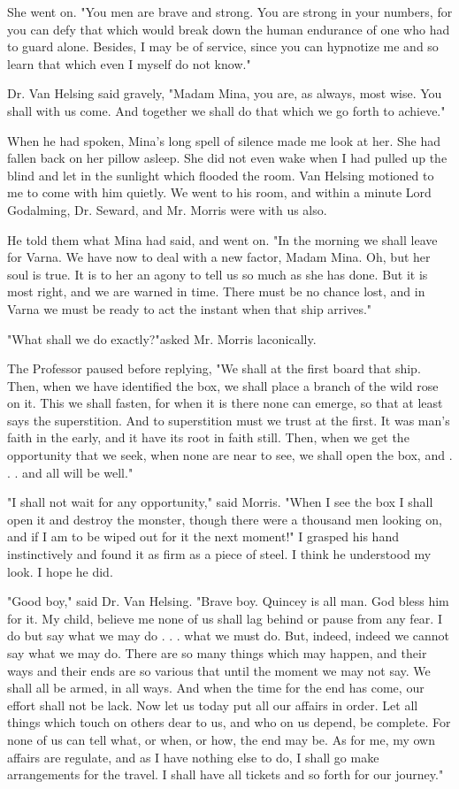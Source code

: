 She went on. "You men are brave and strong. You are strong in your numbers, for you can defy that which would break down the human endurance of one who had to guard alone. Besides, I may be of service, since you can hypnotize me and so learn that which even I myself do not know." 

Dr. Van Helsing said gravely, "Madam Mina, you are, as always, most wise. You shall with us come. And together we shall do that which we go forth to achieve." 

When he had spoken, Mina's long spell of silence made me look at her. She had fallen back on her pillow asleep. She did not even wake when I had pulled up the blind and let in the sunlight which flooded the room. Van Helsing motioned to me to come with him quietly. We went to his room, and within a minute Lord Godalming, Dr. Seward, and Mr. Morris were with us also. 

He told them what Mina had said, and went on. "In the morning we shall leave for Varna. We have now to deal with a new factor, Madam Mina. Oh, but her soul is true. It is to her an agony to tell us so much as she has done. But it is most right, and we are warned in time. There must be no chance lost, and in Varna we must be ready to act the instant when that ship arrives." 

"What shall we do exactly?"asked Mr. Morris laconically. 

The Professor paused before replying, "We shall at the first board that ship. Then, when we have identified the box, we shall place a branch of the wild rose on it. This we shall fasten, for when it is there none can emerge, so that at least says the superstition. And to superstition must we trust at the first. It was man's faith in the early, and it have its root in faith still. Then, when we get the opportunity that we seek, when none are near to see, we shall open the box, and . . . and all will be well." 

"I shall not wait for any opportunity," said Morris. "When I see the box I shall open it and destroy the monster, though there were a thousand men looking on, and if I am to be wiped out for it the next moment!" I grasped his hand instinctively and found it as firm as a piece of steel. I think he understood my look. I hope he did. 

"Good boy," said Dr. Van Helsing. "Brave boy. Quincey is all man. God bless him for it. My child, believe me none of us shall lag behind or pause from any fear. I do but say what we may do . . . what we must do. But, indeed, indeed we cannot say what we may do. There are so many things which may happen, and their ways and their ends are so various that until the moment we may not say. We shall all be armed, in all ways. And when the time for the end has come, our effort shall not be lack. Now let us today put all our affairs in order. Let all things which touch on others dear to us, and who on us depend, be complete. For none of us can tell what, or when, or how, the end may be. As for me, my own affairs are regulate, and as I have nothing else to do, I shall go make arrangements for the travel. I shall have all tickets and so forth for our journey." 

